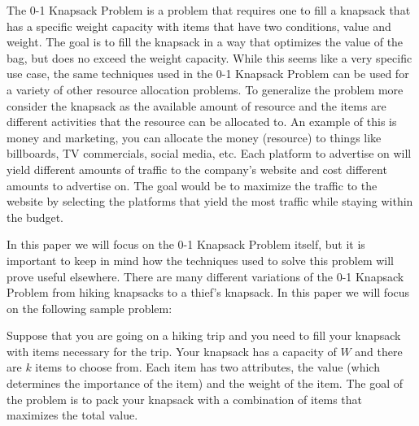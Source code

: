 
\usepackage{booktabs}
\usepackage{color, colortbl}
\usepackage{polynom}
\usepackage{tcolorbox}




	
	
\forceindent The 0-1 Knapsack Problem is a problem that requires one to fill a knapsack that has a specific weight capacity with items that have two conditions, value and weight. The goal is to fill the knapsack in a way that optimizes the value of the bag, but does no exceed the weight capacity. While this seems like a very specific use case, the same techniques used in the 0-1 Knapsack Problem can be used for a variety of other resource allocation problems. To generalize the problem more consider the knapsack as the available amount of resource and the items are different activities that the resource can be allocated to. An example of this is money and marketing, you can allocate the money (resource) to things like billboards, TV commercials, social media, etc. Each platform to advertise on will yield different amounts of traffic to the company's website and cost different amounts to advertise on. The goal would be to maximize the traffic to the website by selecting the platforms that yield the most traffic while staying within the budget. 

\forceindent In this paper we will focus on the 0-1 Knapsack Problem itself, but it is important to keep in mind how the techniques used to solve this problem will prove useful elsewhere. There are many different variations of the 0-1 Knapsack Problem from hiking knapsacks to a thief's knapsack. In this paper we will focus on the following sample problem: 
	\begin{tcolorbox}
		Suppose that you are going on a hiking trip and you need to fill your knapsack with items necessary for the trip. Your knapsack has a capacity of $W$ and there are $k$ items to choose from. Each item has two attributes, the value (which determines the importance of the item) and the weight of the item. The goal of the problem is to pack your knapsack with a combination of items that maximizes the total value. 
	\end{tcolorbox}

